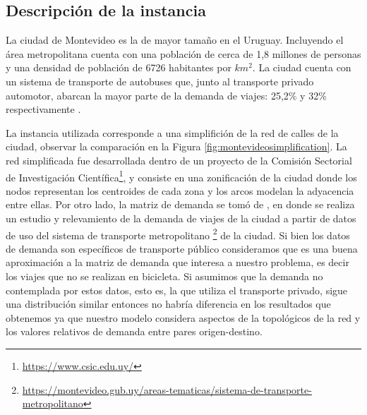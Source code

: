 \subsection{Descripción de la instancia}

La ciudad de Montevideo es la de mayor tamaño en el Uruguay. Incluyendo el área metropolitana cuenta con una población de cerca de 1,8 millones de personas y una densidad de población de 6726 habitantes por $km^2$. La ciudad cuenta con un sistema de transporte de autobuses que, junto al transporte privado automotor, abarcan la mayor parte de la demanda de viajes: 25,2\% y 32\% respectivamente \parencite{Mauttone2017a}.

La instancia utilizada corresponde a una simplifición de la red de calles de la ciudad, observar la comparación en la Figura \ref{fig:montevideosimplification}. La red simplificada fue desarrollada dentro de un proyecto de la Comisión Sectorial de Investigación Científica\footnote{\url{https://www.csic.edu.uy/}}, y consiste en una zonificación de la ciudad donde los nodos representan los centroides de cada zona y los arcos modelan la adyacencia entre ellas. Por otro lado, la matriz de demanda se tomó de \textcite{Massobrio2020}, en donde se realiza un estudio y relevamiento de la demanda de viajes de la ciudad a partir de datos de uso del sistema de transporte metropolitano \footnote{\url{https://montevideo.gub.uy/areas-tematicas/sistema-de-transporte-metropolitano}} de la ciudad. Si bien los datos de demanda son específicos de transporte público consideramos que es una buena aproximación a la matriz de demanda que interesa a nuestro problema, es decir los viajes que no se realizan en bicicleta. Si asumimos que la demanda no contemplada por estos datos, esto es, la que utiliza el transporte privado, sigue una distribución similar entonces no habría diferencia en los resultados que obtenemos ya que nuestro modelo considera aspectos de la topológicos de la red y los valores relativos de demanda entre pares origen-destino.

